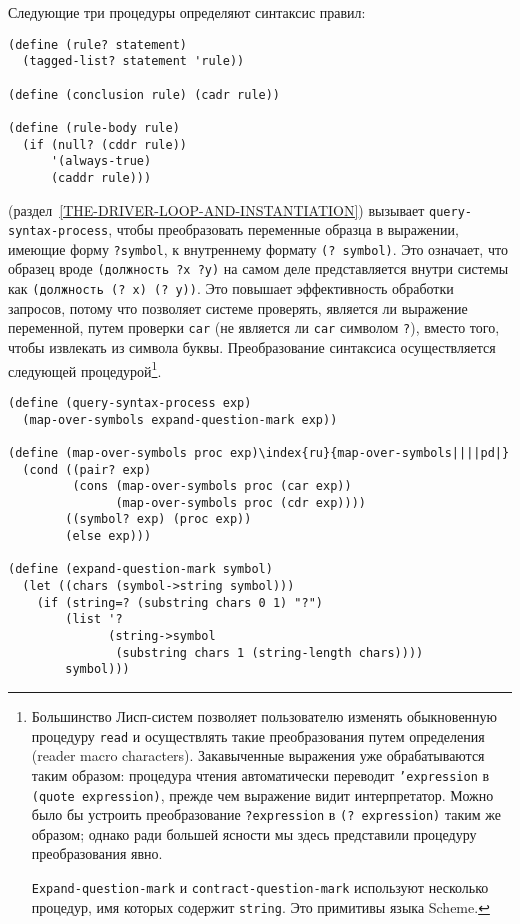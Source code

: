 Следующие три процедуры определяют синтаксис правил:

\begin{Verbatim}[fontsize=\small]
(define (rule? statement)
  (tagged-list? statement 'rule))

(define (conclusion rule) (cadr rule))

(define (rule-body rule)
  (if (null? (cddr rule))
      '(always-true)
      (caddr rule)))
\end{Verbatim}

(раздел~\ref{THE-DRIVER-LOOP-AND-INSTANTIATION}) вызывает
{\tt query-syntax-process}, чтобы преобразовать переменные
образца в выражении, имеющие форму {\tt ?sym\-bol}, к внутреннему
формату {\tt (? symbol)}.  Это означает, что образец вроде
{\tt (должность ?x ?y)} на самом деле представляется внутри
системы как {\tt (должность (? x) (? y))}.  Это повышает
эффективность обработки запросов, потому что позволяет системе
проверять, является ли выражение переменной, путем проверки {\tt car}
(не является ли {\tt car} символом {\tt ?}), вместо
того, чтобы извлекать
из символа буквы.  Преобразование синтаксиса осуществляется следующей
процедурой\footnote{Большинство Лисп-систем позволяет пользователю
изменять обыкновенную процедуру {\tt read} и
осуществлять такие  
преобразования путем определения  (reader macro characters).  Закавыченные выражения уже 
обрабатываются таким образом:
процедура чтения автоматически переводит {\tt 'expression} в
{\tt (quote expression)}, прежде чем выражение видит
интерпретатор.  Можно было бы устроить преобразование
{\tt ?expression} в {\tt (? expression)} таким же
образом; однако ради большей ясности мы здесь представили процедуру
преобразования явно.

{\tt Expand-question-mark} и
{\tt contract-question-mark} используют несколько 
процедур, имя 
которых содержит {\tt string}.  Это примитивы языка Scheme.}.

\begin{Verbatim}[fontsize=\small]
(define (query-syntax-process exp)
  (map-over-symbols expand-question-mark exp))

(define (map-over-symbols proc exp)\index{ru}{map-over-symbols||||pd|}
  (cond ((pair? exp)
         (cons (map-over-symbols proc (car exp))
               (map-over-symbols proc (cdr exp))))
        ((symbol? exp) (proc exp))
        (else exp)))

(define (expand-question-mark symbol)
  (let ((chars (symbol->string symbol)))
    (if (string=? (substring chars 0 1) "?")
        (list '?
              (string->symbol
               (substring chars 1 (string-length chars))))
        symbol)))
\end{Verbatim}

